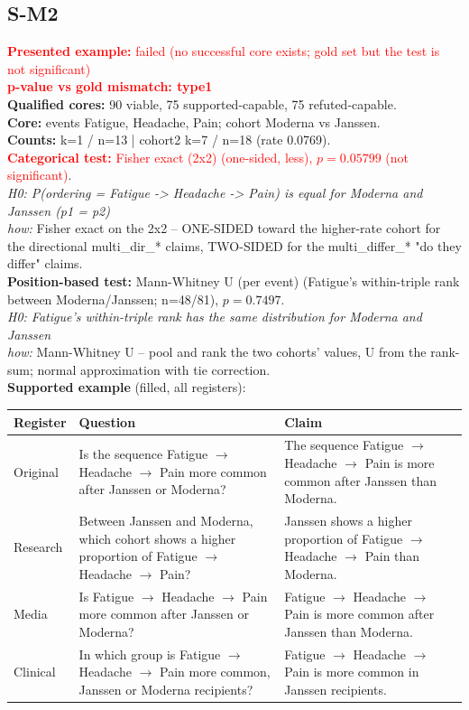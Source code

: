 \documentclass[11pt]{article}
\begin{document}
\subsection*{S-M2}
\textcolor{red}{\textbf{Presented example:} failed (no successful core exists; gold set but the test is not significant)} \\
\textcolor{red}{\textbf{p-value vs gold mismatch: type1}} \\
\textbf{Qualified cores:} 90 viable, 75 supported-capable, 75 refuted-capable. \\
\textbf{Core:} events Fatigue, Headache, Pain; cohort Moderna vs Janssen. \\
\textbf{Counts:} k=1 / n=13  |  cohort2 k=7 / n=18  (rate 0.0769). \\
\textcolor{red}{\textbf{Categorical test:} Fisher exact (2x2) (one-sided, less), $p = 0.05799$ (not significant)}. \\
\emph{H0: P(ordering = Fatigue -> Headache -> Pain) is equal for Moderna and Janssen (p1 = p2)} \\
\emph{how:} Fisher exact on the 2x2 -- ONE-SIDED toward the higher-rate cohort for the directional multi\_dir\_* claims, TWO-SIDED for the multi\_differ\_* "do they differ" claims. \\
\textbf{Position-based test:} Mann-Whitney U (per event) (Fatigue's within-triple rank between Moderna/Janssen; n=48/81), $p = 0.7497$. \\
\emph{H0: Fatigue's within-triple rank has the same distribution for Moderna and Janssen} \\
\emph{how:} Mann-Whitney U -- pool and rank the two cohorts' values, U from the rank-sum; normal approximation with tie correction. \\
\textbf{Supported example} (filled, all registers): \\
\begin{tabularx}{\linewidth}{@{}l L L@{}}
\toprule
\textbf{Register} & \textbf{Question} & \textbf{Claim} \\
\midrule
Original & Is the sequence Fatigue $\rightarrow$  Headache $\rightarrow$  Pain more common after Janssen or Moderna? & The sequence Fatigue $\rightarrow$  Headache $\rightarrow$  Pain is more common after Janssen than Moderna. \\
Research & Between Janssen and Moderna, which cohort shows a higher proportion of Fatigue $\rightarrow$  Headache $\rightarrow$  Pain? & Janssen shows a higher proportion of Fatigue $\rightarrow$  Headache $\rightarrow$  Pain than Moderna. \\
Media & Is Fatigue $\rightarrow$  Headache $\rightarrow$  Pain more common after Janssen or Moderna? & Fatigue $\rightarrow$  Headache $\rightarrow$  Pain is more common after Janssen than Moderna. \\
Clinical & In which group is Fatigue $\rightarrow$  Headache $\rightarrow$  Pain more common, Janssen or Moderna recipients? & Fatigue $\rightarrow$  Headache $\rightarrow$  Pain is more common in Janssen recipients. \\
\bottomrule
\end{tabularx}
\end{document}
